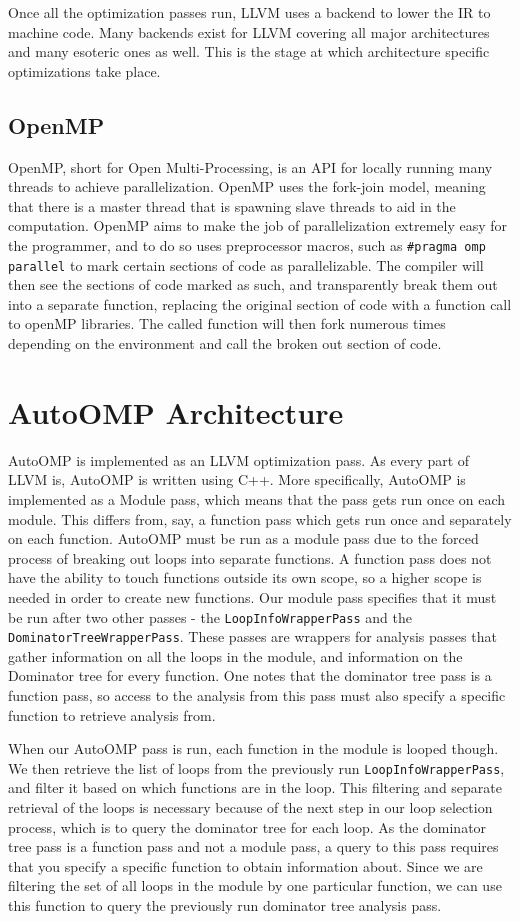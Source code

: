 \documentclass[conference]{IEEEtran}
\begin{document}
Once all the optimization passes run, LLVM uses a backend to lower the
IR to machine code. Many backends exist for LLVM covering all major
architectures and many esoteric ones as well. This is the stage at
which architecture specific optimizations take place.

\subsection{OpenMP}
OpenMP, short for Open Multi-Processing, is an API for locally running
many threads to achieve parallelization. OpenMP uses the fork-join
model, meaning that there is a master thread that is spawning slave
threads to aid in the computation. OpenMP aims to make the job of
parallelization extremely easy for the programmer, and to do so uses
preprocessor macros, such as \texttt{\#pragma omp parallel} to mark
certain sections of code as parallelizable. The compiler will then see
the sections of code marked as such, and transparently break them out into a
separate function, replacing the original section of code with a
function call to openMP libraries. The called function will then fork
numerous times depending on the environment and call the broken out
section of code.

\section{AutoOMP Architecture}
AutoOMP is implemented as an LLVM optimization pass. As every part of
LLVM is, AutoOMP is written using C++. More specifically, AutoOMP is
implemented as a Module pass, which means that the pass gets run once
on each module. This differs from, say, a function pass which gets run
once and separately on each function. AutoOMP must be run as a module
pass due to the forced process of breaking out loops into separate
functions. A function pass does not have the ability to touch
functions outside its own scope, so a higher scope is needed in order
to create new functions. Our module pass specifies that it must be run
after two other passes - the \texttt{LoopInfoWrapperPass} and the
\texttt{DominatorTreeWrapperPass}. These passes are wrappers for
analysis passes that gather information on all the loops in the
module, and information on the Dominator tree for every function. One
notes that the dominator tree pass is a function pass, so access to
the analysis from this pass must also specify a specific function to
retrieve analysis from.

When our AutoOMP pass is run, each function in the module is looped
though. We then retrieve the list of loops from the previously run
\texttt{LoopInfoWrapperPass}, and filter it based on which functions
are in the loop. This filtering and separate retrieval of the loops is
necessary because of the next step in our loop selection process,
which is to query the dominator tree for each loop. As the dominator
tree pass is a function pass and not a module pass, a query to this
pass requires that you specify a specific function to obtain
information about. Since we are filtering the set of all loops in the
module by one particular function, we can use this function to query
the previously run dominator tree analysis pass.
\end{document}
